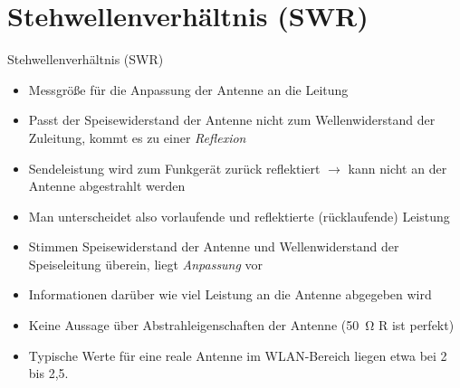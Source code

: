 
\section{Stehwellenverhältnis (SWR)}
\label{section:swr}
\begin{frame}{Stehwellenverhältnis (SWR)}
    \small
    \begin{itemize}
        \item Messgröße für die Anpassung der Antenne an die Leitung
        \item Passt der Speisewiderstand der Antenne nicht zum Wellenwiderstand der Zuleitung, kommt es zu einer \emph{Reflexion}
        \item Sendeleistung wird zum Funkgerät zurück reflektiert $\rightarrow$ kann nicht an der Antenne abgestrahlt werden
        \item Man unterscheidet also vorlaufende und reflektierte (rücklaufende) Leistung
        \item Stimmen Speisewiderstand der Antenne und Wellenwiderstand der Speiseleitung überein, liegt \emph{Anpassung} vor
        \item Informationen darüber wie viel Leistung an die Antenne abgegeben wird
        \item Keine Aussage über Abstrahleigenschaften der Antenne (\SI{50}{\ohm} R ist perfekt)
        \item Typische Werte für eine reale Antenne im WLAN-Bereich liegen etwa bei 2 bis 2,5.
    \end{itemize}
\end{frame}
  

